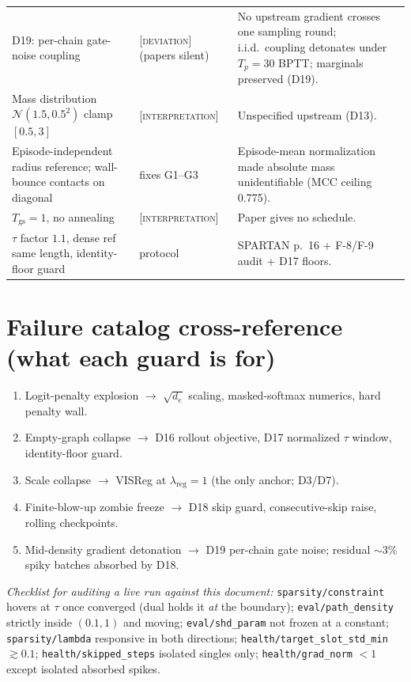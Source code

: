 \documentclass[11pt]{article}
\newcommand{\code}[1]{\texttt{\small #1}}
\newcommand{\interp}{\textcolor{orange!80!black}{[\textsc{interpretation}]}}
\newcommand{\dev}{\textcolor{red!70!black}{[\textsc{deviation}]}}
\begin{document}
\begin{longtable}{p{} p{} p{}}
D19: per-chain gate-noise coupling & \dev{} (papers silent) & No upstream gradient crosses one sampling round; i.i.d.\ coupling detonates under $T_p{=}30$ BPTT; marginals preserved (D19). \\
Mass distribution $\mathcal N(1.5,0.5^2)$ clamp $[0.5,3]$ & \interp{} & Unspecified upstream (D13). \\
Episode-independent radius reference; wall-bounce contacts on diagonal & fixes G1--G3 & Episode-mean normalization made absolute mass unidentifiable (MCC ceiling 0.775). \\
$T_{\mathrm{gs}} = 1$, no annealing & \interp{} & Paper gives no schedule. \\
$\tau$ factor $1.1$, dense ref same length, identity-floor guard & protocol & SPARTAN p.~16 + F-8/F-9 audit + D17 floors. \\
\bottomrule
\end{longtable}

\section{Failure catalog cross-reference (what each guard is for)}
\begin{enumerate}[nosep]
  \item Logit-penalty explosion $\to$ $\sqrt{d_e}$ scaling, masked-softmax numerics, hard penalty wall.
  \item Empty-graph collapse $\to$ D16 rollout objective, D17 normalized $\tau$ window, identity-floor guard.
  \item Scale collapse $\to$ VISReg at $\lambda_{\mathrm{reg}}{=}1$ (the only anchor; D3/D7).
  \item Finite-blow-up zombie freeze $\to$ D18 skip guard, consecutive-skip raise, rolling checkpoints.
  \item Mid-density gradient detonation $\to$ D19 per-chain gate noise; residual $\sim$3\% spiky batches absorbed by D18.
\end{enumerate}

\vspace{1em}
\noindent\emph{Checklist for auditing a live run against this document:}
\code{sparsity/constraint} hovers at $\tau$ once converged (dual holds it \emph{at} the
boundary); \code{eval/path\_density} strictly inside $(0.1, 1)$ and moving;
\code{eval/shd\_param} not frozen at a constant; \code{sparsity/lambda} responsive in both
directions; \code{health/target\_slot\_std\_min} $\gtrsim 0.1$;
\code{health/skipped\_steps} isolated singles only; \code{health/grad\_norm} $< 1$ except
isolated absorbed spikes.
\end{document}
